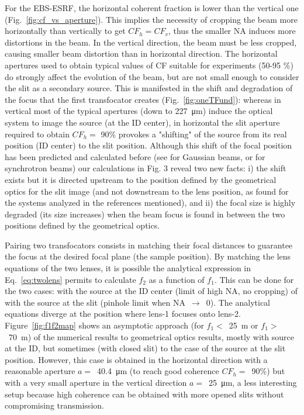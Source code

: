 \documentclass{iucr}              %
\begin{document}
For the EBS-ESRF, the horizontal coherent fraction is lower than the vertical one (Fig.~\ref{fig:cf_vs_aperture}). This implies the necessity of cropping the beam more horizontally than vertically to get $CF_h=CF_v$, thus the smaller NA induces more distortions in the beam. In the vertical direction, the beam must be less cropped, causing smaller beam distortion than in horizontal direction. The horizontal apertures used to obtain typical values of CF suitable for experiments (50-95 \%) do strongly affect the evolution of the beam, but are not small enough to consider the slit as a secondary source. This is manifested in the shift and degradation of the focus that the first transfocator creates (Fig.~\ref{fig:oneTFund}): whereas in vertical most of the typical apertures (down to \SI{227}{\micro\meter}) induce the optical system to image the source (at the ID center), in horizontal the slit aperture required to obtain $CF_h=$ 90\% provokes a "shifting" of the source from its real position (ID center) to the slit position. Although this shift of the focal position has been predicted and calculated before (see  for Gaussian beams, or  for synchrotron beams) our calculations in Fig. 3 reveal two new facts: i) the shift exists but it is directed upstream to the position defined by the geometrical optics for the slit image (and not downstream to the lens position, as found for the systems analyzed in the references mentioned), and ii) the focal size is highly degraded (its size increases) when the beam focus is found in between the two positions defined by the geometrical optics.  

Pairing two transfocators consists in matching their focal distances to guarantee the focus at the desired focal plane (the sample position). By matching the lens equations of the two lenses, it is possible the analytical expression in Eq.~\ref{eq:twolens} permits to calculate $f_2$ as a function of $f_1$. This can be done for the two cases: with the source at the ID center (limit of high NA, no cropping) of with the source at the slit (pinhole limit when NA~$\rightarrow$~0). The analytical equations diverge at the position where lens-1 focuses onto lens-2.
Figure~\ref{fig:f1f2map} shows an asymptotic approach (for $f_1<$~\SI{25}{\meter} or $f_1>$~\SI{70}{\meter}) of the numerical results to geometrical optics results, mostly with source at the ID, but sometimes (with closed slit) to the case of the source at the slit position. However, this case is obtained in the horizontal direction with a reasonable aperture $a=$~\SI{40.4}{\micro\meter} (to reach good coherence $CF_h=$~90\%) but with a very small aperture in the vertical direction $a=$~\SI{25}{\micro\meter}, a less interesting setup because high coherence can be obtained with more opened slits without compromising transmission. 
\end{document}
